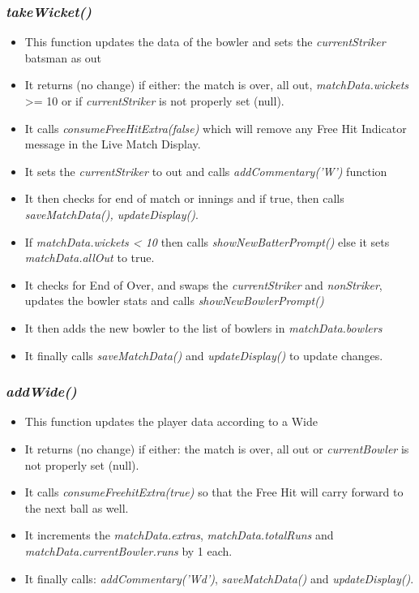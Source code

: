 \documentclass[a4paper,12pt]{article}
\begin{document}
\subsubsection{\textit{takeWicket()}}
\begin{itemize}
\item This function updates the data of the bowler and sets the \textit{currentStriker} batsman as out
\item It returns (no change) if either: the match is over, all out, \textit{matchData.wickets} >= 10 or if \textit{currentStriker} is not properly set (null).
\item It calls \textit{consumeFreeHitExtra(false)} which will remove any Free Hit Indicator message in the Live Match Display.
\item It sets the \textit{currentStriker} to out and calls \textit{addCommentary('W')} function
\item It then checks for end of match or innings and if true, then calls \textit{saveMatchData(), updateDisplay()}.
\item If \textit{matchData.wickets < 10} then calls \textit{showNewBatterPrompt()} else it sets \textit{matchData.allOut} to true.
\item It checks for End of Over, and swaps the \textit{currentStriker} and \textit{nonStriker}, updates the bowler stats and calls \textit{showNewBowlerPrompt()}
\item It then adds the new bowler to the list of bowlers in \textit{matchData.bowlers}
\item It finally calls \textit{saveMatchData()} and \textit{updateDisplay()} to update changes.
\end{itemize}

\subsubsection{\textit{addWide()}}
\begin{itemize}
\item This function updates the player data according to a Wide 
\item It returns (no change) if either: the match is over, all out or \textit{currentBowler} is not properly set (null).
\item It calls \textit{consumeFreehitExtra(true)} so that the Free Hit will carry forward to the next ball as well.
\item It increments the \textit{matchData.extras}, \textit{matchData.totalRuns} and \textit{matchData.currentBowler.runs} by 1 each.
\item It finally calls: \textit{addCommentary('Wd')}, \textit{saveMatchData()} and \textit{updateDisplay()}.
\end{itemize}
\end{document}
